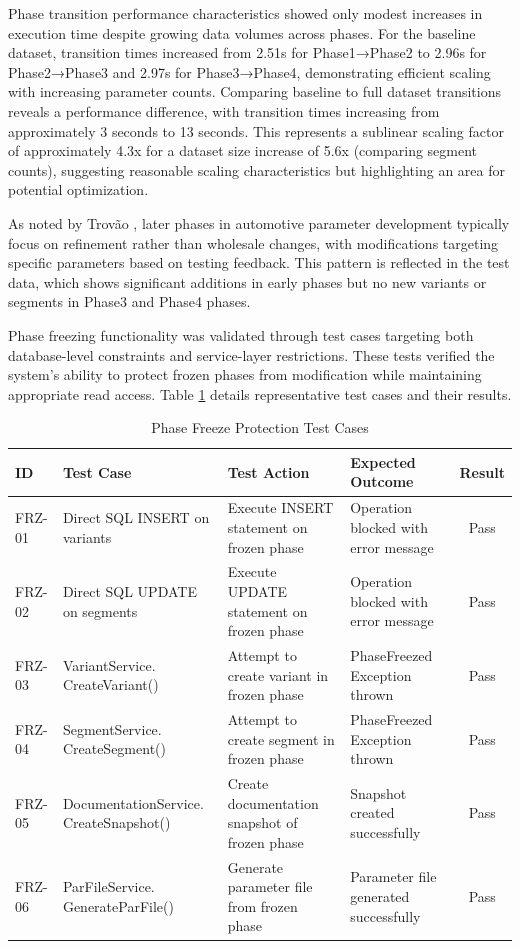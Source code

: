 Phase transition performance characteristics showed only modest increases in execution time despite growing data volumes across phases. For the baseline dataset, transition times increased from 2.51s for Phase1→Phase2 to 2.96s for Phase2→Phase3 and 2.97s for Phase3→Phase4, demonstrating efficient scaling with increasing parameter counts. Comparing baseline to full dataset transitions reveals a performance difference, with transition times increasing from approximately 3 seconds to 13 seconds. This represents a sublinear scaling factor of approximately 4.3x for a dataset size increase of 5.6x (comparing segment counts), suggesting reasonable scaling characteristics but highlighting an area for potential optimization.

As noted by Trovão \cite{trovao2024evolution}, later phases in automotive parameter development typically focus on refinement rather than wholesale changes, with modifications targeting specific parameters based on testing feedback. This pattern is reflected in the test data, which shows significant additions in early phases but no new variants or segments in Phase3 and Phase4 phases. 

Phase freezing functionality was validated through test cases targeting both database-level constraints and service-layer restrictions. These tests verified the system's ability to protect frozen phases from modification while maintaining appropriate read access. Table \ref{tab:phase-freeze-cases} details representative test cases and their results.

\begin{table}[H]
\centering
\caption{Phase Freeze Protection Test Cases}
\label{tab:phase-freeze-cases}
\begin{tabular}{|p{0.7cm}|p{4.1cm}|p{3.5cm}|p{3.5cm}|c|}
\hline
\textbf{ID} & \textbf{Test Case} & \textbf{Test Action} & \textbf{Expected Outcome} & \textbf{Result} \\
\hline
FRZ-01 & Direct SQL INSERT on variants & Execute INSERT statement on frozen phase & Operation blocked with error message & Pass \\  
\hline
FRZ-02 & Direct SQL UPDATE on segments & Execute UPDATE statement on frozen phase & Operation blocked with error message & Pass \\
\hline
FRZ-03 & VariantService. CreateVariant() & Attempt to create variant in frozen phase & PhaseFreezed Exception thrown & Pass \\
\hline
FRZ-04 & SegmentService. CreateSegment() & Attempt to create segment in frozen phase & PhaseFreezed Exception thrown & Pass \\
\hline
FRZ-05 & DocumentationService. CreateSnapshot() & Create documentation snapshot of frozen phase & Snapshot created successfully & Pass \\
\hline
FRZ-06 & ParFileService. GenerateParFile() & Generate parameter file from frozen phase & Parameter file generated successfully & Pass \\
\hline
\end{tabular}
\end{table}


